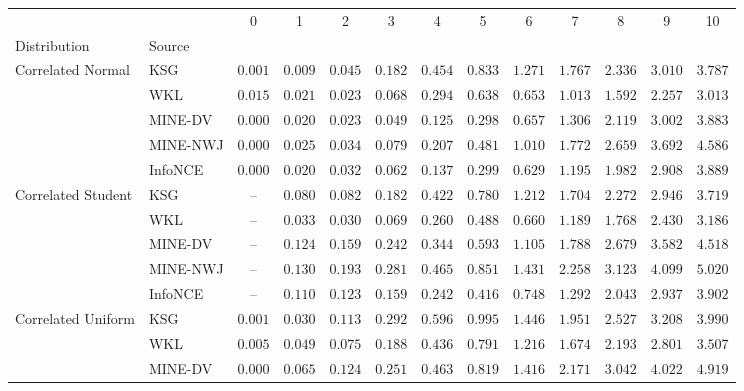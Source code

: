 \begin{tabular}{llccccccccccc}
\toprule
 &  & 0 & 1 & 2 & 3 & 4 & 5 & 6 & 7 & 8 & 9 & 10 \\
Distribution & Source &  &  &  &  &  &  &  &  &  &  &  \\
\midrule
\multirow[l]{5}{*}{Correlated Normal} & KSG & $ 0.001 $ & $ 0.009 $ & $ 0.045 $ & $ 0.182 $ & $ 0.454 $ & $ 0.833 $ & $ 1.271 $ & $ 1.767 $ & $ 2.336 $ & $ 3.010 $ & $ 3.787 $ \\
 & WKL & $ 0.015 $ & $ 0.021 $ & $ 0.023 $ & $ 0.068 $ & $ 0.294 $ & $ 0.638 $ & $ 0.653 $ & $ 1.013 $ & $ 1.592 $ & $ 2.257 $ & $ 3.013 $ \\
 & MINE-DV & $ 0.000 $ & $ 0.020 $ & $ 0.023 $ & $ 0.049 $ & $ 0.125 $ & $ 0.298 $ & $ 0.657 $ & $ 1.306 $ & $ 2.119 $ & $ 3.002 $ & $ 3.883 $ \\
 & MINE-NWJ & $ 0.000 $ & $ 0.025 $ & $ 0.034 $ & $ 0.079 $ & $ 0.207 $ & $ 0.481 $ & $ 1.010 $ & $ 1.772 $ & $ 2.659 $ & $ 3.692 $ & $ 4.586 $ \\
 & InfoNCE & $ 0.000 $ & $ 0.020 $ & $ 0.032 $ & $ 0.062 $ & $ 0.137 $ & $ 0.299 $ & $ 0.629 $ & $ 1.195 $ & $ 1.982 $ & $ 2.908 $ & $ 3.889 $ \\
\cmidrule{1-13}
\multirow[l]{5}{*}{Correlated Student} & KSG & -- & $ 0.080 $ & $ 0.082 $ & $ 0.182 $ & $ 0.422 $ & $ 0.780 $ & $ 1.212 $ & $ 1.704 $ & $ 2.272 $ & $ 2.946 $ & $ 3.719 $ \\
 & WKL & -- & $ 0.033 $ & $ 0.030 $ & $ 0.069 $ & $ 0.260 $ & $ 0.488 $ & $ 0.660 $ & $ 1.189 $ & $ 1.768 $ & $ 2.430 $ & $ 3.186 $ \\
 & MINE-DV & -- & $ 0.124 $ & $ 0.159 $ & $ 0.242 $ & $ 0.344 $ & $ 0.593 $ & $ 1.105 $ & $ 1.788 $ & $ 2.679 $ & $ 3.582 $ & $ 4.518 $ \\
 & MINE-NWJ & -- & $ 0.130 $ & $ 0.193 $ & $ 0.281 $ & $ 0.465 $ & $ 0.851 $ & $ 1.431 $ & $ 2.258 $ & $ 3.123 $ & $ 4.099 $ & $ 5.020 $ \\
 & InfoNCE & -- & $ 0.110 $ & $ 0.123 $ & $ 0.159 $ & $ 0.242 $ & $ 0.416 $ & $ 0.748 $ & $ 1.292 $ & $ 2.043 $ & $ 2.937 $ & $ 3.902 $ \\
\cmidrule{1-13}
\multirow[l]{5}{*}{Correlated Uniform} & KSG & $ 0.001 $ & $ 0.030 $ & $ 0.113 $ & $ 0.292 $ & $ 0.596 $ & $ 0.995 $ & $ 1.446 $ & $ 1.951 $ & $ 2.527 $ & $ 3.208 $ & $ 3.990 $ \\
 & WKL & $ 0.005 $ & $ 0.049 $ & $ 0.075 $ & $ 0.188 $ & $ 0.436 $ & $ 0.791 $ & $ 1.216 $ & $ 1.674 $ & $ 2.193 $ & $ 2.801 $ & $ 3.507 $ \\
 & MINE-DV & $ 0.000 $ & $ 0.065 $ & $ 0.124 $ & $ 0.251 $ & $ 0.463 $ & $ 0.819 $ & $ 1.416 $ & $ 2.171 $ & $ 3.042 $ & $ 4.022 $ & $ 4.919 $ \\

\end{tabular}
